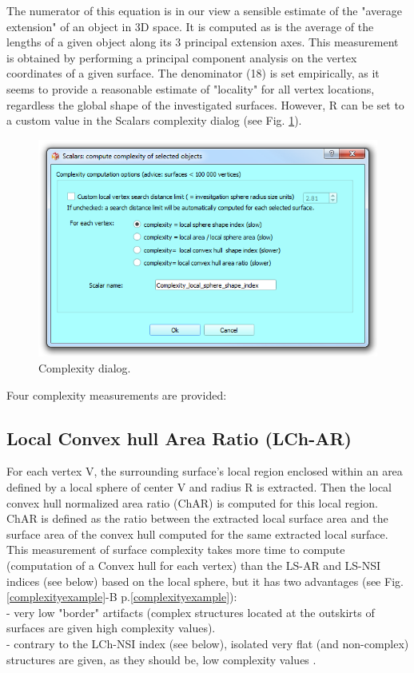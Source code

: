The numerator of this equation is in our view a sensible estimate of the "average extension" of an object in 3D space. It is computed as is the average of the lengths of a given object along its 3 principal extension axes. This measurement is obtained  by performing a principal component analysis on the vertex coordinates of a given surface. The denominator (18) is set empirically, as it seems to provide a reasonable estimate of "locality" for all vertex locations, regardless the global shape of the investigated surfaces. However, R can be set to a custom value in the Scalars complexity dialog (see Fig. \ref{complexity_dialog}).

\begin{figure}
  \centering
  \includegraphics[scale=0.5]{images/11/complexity_dialog.png} 
	\caption{Complexity dialog.}
\label{complexity_dialog}
 
\end{figure}


Four complexity measurements are provided:

\subsection{Local Convex hull Area Ratio (LCh-AR)}
For each vertex V, the surrounding surface's local region enclosed within an area defined by a local sphere of center V and radius R is extracted. Then the local convex hull normalized area ratio (ChAR) is computed  for this  local region. ChAR is defined as the ratio between the extracted local surface area and the surface area of the convex hull computed for the same extracted local surface. \\
 This measurement of surface complexity takes more time to compute (computation of a Convex hull for each vertex) than the LS-AR and LS-NSI indices (see below) based on the local sphere, but it has two advantages (see Fig. \ref{complexityexample}-B p.\ref{complexityexample}):\\
- very low "border" artifacts (complex structures located at the outskirts of surfaces are given high complexity values).\\
- contrary to the LCh-NSI index (see below), isolated very flat (and non-complex) structures are given, as they should be, low complexity values .

